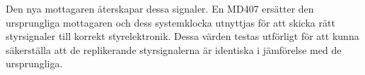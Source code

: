 \documentclass[a4paper]{article}
\begin{document}

\vspace{5mm} \noindent
Den nya mottagaren återskapar dessa signaler. En MD407 ersätter den ursprungliga mottagaren och dess systemklocka utnyttjas för att skicka rätt styrsignaler till korrekt styrelektronik. Dessa värden testas utförligt för att kunna säkerställa att de replikerande styrsignalerna är identiska i jämförelse med de ursprungliga.









%

\end{document}
